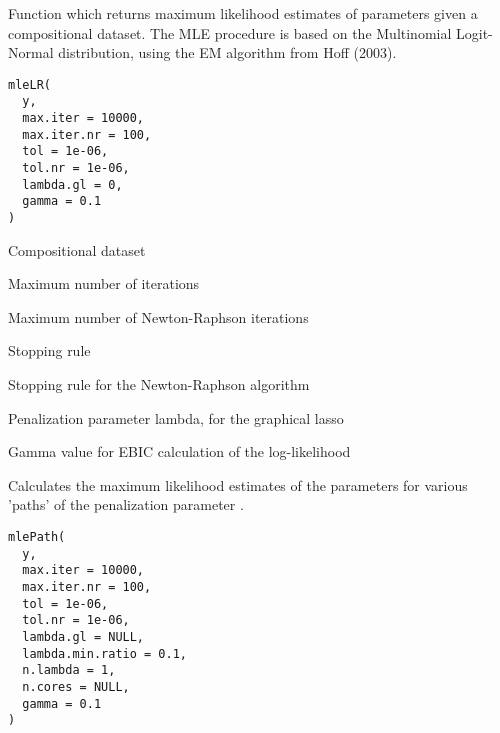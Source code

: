 \documentclass[a4paper]{book}
\begin{document}
%
\begin{Description}\relax
Function which returns maximum likelihood estimates of parameters given a compositional
dataset. The MLE procedure is based on the Multinomial Logit-Normal distribution, 
using the EM algorithm from Hoff (2003).
\end{Description}
%
\begin{Usage}
\begin{verbatim}
mleLR(
  y,
  max.iter = 10000,
  max.iter.nr = 100,
  tol = 1e-06,
  tol.nr = 1e-06,
  lambda.gl = 0,
  gamma = 0.1
)
\end{verbatim}
\end{Usage}
%
\begin{Arguments}
\begin{ldescription}
\item[\code{y}] Compositional dataset

\item[\code{max.iter}] Maximum number of iterations

\item[\code{max.iter.nr}] Maximum number of Newton-Raphson iterations

\item[\code{tol}] Stopping rule

\item[\code{tol.nr}] Stopping rule for the Newton-Raphson algorithm

\item[\code{lambda.gl}] Penalization parameter lambda, for the graphical lasso

\item[\code{gamma}] Gamma value for EBIC calculation of the log-likelihood
\end{ldescription}
\end{Arguments}
%
\begin{Description}\relax
Calculates the maximum likelihood estimates of the parameters for various 'paths'
of the penalization parameter .
\end{Description}
%
\begin{Usage}
\begin{verbatim}
mlePath(
  y,
  max.iter = 10000,
  max.iter.nr = 100,
  tol = 1e-06,
  tol.nr = 1e-06,
  lambda.gl = NULL,
  lambda.min.ratio = 0.1,
  n.lambda = 1,
  n.cores = NULL,
  gamma = 0.1
)
\end{verbatim}
\end{Usage}
\end{document}
